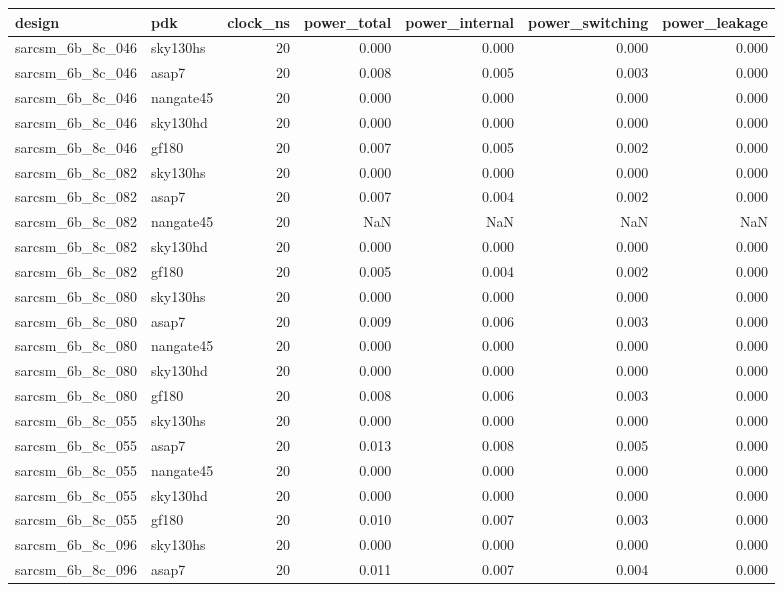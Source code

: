 \begin{tabular}{llrrrrr}
\toprule
design & pdk & clock\_ns & power\_total & power\_internal & power\_switching & power\_leakage \\
\midrule
sarcsm\_6b\_8c\_046 & sky130hs & 20 & 0.000 & 0.000 & 0.000 & 0.000 \\
sarcsm\_6b\_8c\_046 & asap7 & 20 & 0.008 & 0.005 & 0.003 & 0.000 \\
sarcsm\_6b\_8c\_046 & nangate45 & 20 & 0.000 & 0.000 & 0.000 & 0.000 \\
sarcsm\_6b\_8c\_046 & sky130hd & 20 & 0.000 & 0.000 & 0.000 & 0.000 \\
sarcsm\_6b\_8c\_046 & gf180 & 20 & 0.007 & 0.005 & 0.002 & 0.000 \\
sarcsm\_6b\_8c\_082 & sky130hs & 20 & 0.000 & 0.000 & 0.000 & 0.000 \\
sarcsm\_6b\_8c\_082 & asap7 & 20 & 0.007 & 0.004 & 0.002 & 0.000 \\
sarcsm\_6b\_8c\_082 & nangate45 & 20 & NaN & NaN & NaN & NaN \\
sarcsm\_6b\_8c\_082 & sky130hd & 20 & 0.000 & 0.000 & 0.000 & 0.000 \\
sarcsm\_6b\_8c\_082 & gf180 & 20 & 0.005 & 0.004 & 0.002 & 0.000 \\
sarcsm\_6b\_8c\_080 & sky130hs & 20 & 0.000 & 0.000 & 0.000 & 0.000 \\
sarcsm\_6b\_8c\_080 & asap7 & 20 & 0.009 & 0.006 & 0.003 & 0.000 \\
sarcsm\_6b\_8c\_080 & nangate45 & 20 & 0.000 & 0.000 & 0.000 & 0.000 \\
sarcsm\_6b\_8c\_080 & sky130hd & 20 & 0.000 & 0.000 & 0.000 & 0.000 \\
sarcsm\_6b\_8c\_080 & gf180 & 20 & 0.008 & 0.006 & 0.003 & 0.000 \\
sarcsm\_6b\_8c\_055 & sky130hs & 20 & 0.000 & 0.000 & 0.000 & 0.000 \\
sarcsm\_6b\_8c\_055 & asap7 & 20 & 0.013 & 0.008 & 0.005 & 0.000 \\
sarcsm\_6b\_8c\_055 & nangate45 & 20 & 0.000 & 0.000 & 0.000 & 0.000 \\
sarcsm\_6b\_8c\_055 & sky130hd & 20 & 0.000 & 0.000 & 0.000 & 0.000 \\
sarcsm\_6b\_8c\_055 & gf180 & 20 & 0.010 & 0.007 & 0.003 & 0.000 \\
sarcsm\_6b\_8c\_096 & sky130hs & 20 & 0.000 & 0.000 & 0.000 & 0.000 \\
sarcsm\_6b\_8c\_096 & asap7 & 20 & 0.011 & 0.007 & 0.004 & 0.000 \\

\end{tabular}
